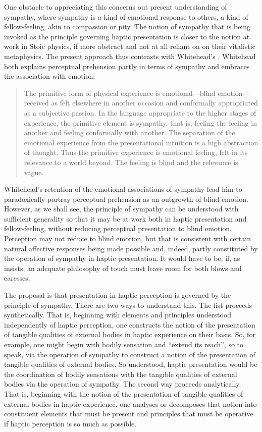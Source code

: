 One obstacle to appreciating this concerns out present understanding of sympathy, where sympathy is a kind of emotional response to others, a kind of fellow-feeling, akin to compassion or pity. The notion of sympathy that is being invoked as the principle governing haptic presentation is closer to the notion at work in Stoic physics, if more abstract and not at all reliant on on their vitalistic metaphysics. The present approach thus contrasts with Whitehead's \citeyearpar{Whitehead:1978zr}. Whitehead both explains perceptual prehension partly in terms of sympathy and embraces the association with emotion:
\begin{quote}
	The primitive form of physical experience is emotional---blind emotion---received as felt elsewhere in another occasion and conformally appropriated as a subjective passion. In the language appropriate to the higher stages of experience, the primitive element is sympathy, that is, feeling the feeling in another and feeling conformally with another. The separation of the emotional experience from the presentational intuition is a high abstraction of thought. Thus the primitive experience is emotional feeling, felt in its relevance to a world beyond. The feeling is blind and the relevance is vague. \citep[162-3]{Whitehead:1978zr}
\end{quote}
Whitehead's retention of the emotional associations of sympathy lead him to paradoxically portray perceptual prehension as an outgrowth of blind emotion. However, as we shall see, the principle of sympathy can be understood with sufficient generality so that it may be at work both in haptic presentation and fellow-feeling, without reducing perceptual presentation to blind emotion. Perception may not reduce to blind emotion, but that is consistent with certain natural affective responses being made possible and, indeed, partly constituted by the operation of sympathy in haptic presentation. It would have to be, if, as \citet[chapter 4]{Derrida:2005aa} insists, an adequate philosophy of touch must leave room for both blows and caresses.

The proposal is that presentation in haptic perception is governed by the principle of sympathy. There are two ways to understand this. The fist proceeds synthetically. That is, beginning with elements and principles understood independently of haptic perception, one constructs the notion of the presentation of tangible qualities of external bodies in haptic experience on their basis. So, for example, one might begin with bodily sensation and ``extend its reach'', so to speak, via the operation of sympathy to construct a notion of the presentation of tangible qualities of external bodies. So understood, haptic presentation would be the coordination of bodily sensations with the tangible qualities of external bodies via the operation of sympathy. The second way proceeds analytically. That is, beginning with the notion of the presentation of tangible qualities of external bodies in haptic experience, one analyses or decomposes that notion into constituent elements that must be present and principles that must be operative if haptic perception is so much as possible. 


